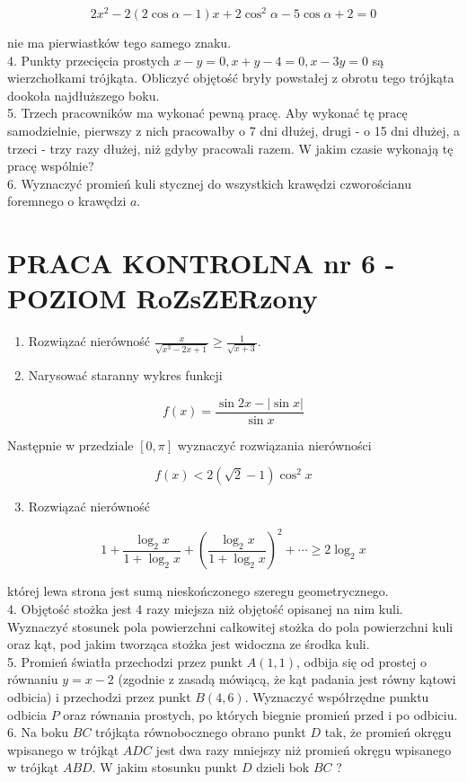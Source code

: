 \documentclass[10pt]{article}
\begin{document}
$$
2 x^{2}-2(2 \cos \alpha-1) x+2 \cos ^{2} \alpha-5 \cos \alpha+2=0
$$

nie ma pierwiastków tego samego znaku.\\
4. Punkty przecięcia prostych $x-y=0, x+y-4=0, x-3 y=0$ są wierzchołkami trójkąta. Obliczyć objętość bryły powstałej z obrotu tego trójkąta dookoła najdłuższego boku.\\
5. Trzech pracowników ma wykonać pewną pracę. Aby wykonać tę pracę samodzielnie, pierwszy z nich pracowałby o 7 dni dłużej, drugi - o 15 dni dłużej, a trzeci - trzy razy dłużej, niż gdyby pracowali razem. W jakim czasie wykonają tę pracę wspólnie?\\
6. Wyznaczyć promień kuli stycznej do wszystkich krawędzi czworościanu foremnego o krawędzi $a$.

\section*{PRACA KONTROLNA nr 6 - POZIOM RoZsZERzony}
\begin{enumerate}
  \item Rozwiązać nierówność $\frac{x}{\sqrt{x^{3}-2 x+1}} \geqslant \frac{1}{\sqrt{x+3}}$.
  \item Narysować staranny wykres funkcji
\end{enumerate}

$$
f(x)=\frac{\sin 2 x-|\sin x|}{\sin x}
$$

Następnie w przedziale $[0, \pi]$ wyznaczyć rozwiązania nierówności

$$
f(x)<2(\sqrt{2}-1) \cos ^{2} x
$$

\begin{enumerate}
  \setcounter{enumi}{2}
  \item Rozwiązać nierówność
\end{enumerate}

$$
1+\frac{\log _{2} x}{1+\log _{2} x}+\left(\frac{\log _{2} x}{1+\log _{2} x}\right)^{2}+\cdots \geqslant 2 \log _{2} x
$$

której lewa strona jest sumą nieskończonego szeregu geometrycznego.\\
4. Objętość stożka jest 4 razy miejsza niż objętość opisanej na nim kuli. Wyznaczyć stosunek pola powierzchni całkowitej stożka do pola powierzchni kuli oraz kąt, pod jakim tworząca stożka jest widoczna ze środka kuli.\\
5. Promień światła przechodzi przez punkt $A(1,1)$, odbija się od prostej o równaniu $y=x-2$ (zgodnie z zasadą mówiącą, że kąt padania jest równy kątowi odbicia) i przechodzi przez punkt $B(4,6)$. Wyznaczyć współrzędne punktu odbicia $P$ oraz równania prostych, po których biegnie promień przed i po odbiciu.\\
6. Na boku $B C$ trójkąta równobocznego obrano punkt $D$ tak, że promień okręgu wpisanego w trójkąt $A D C$ jest dwa razy mniejszy niż promień okręgu wpisanego w trójkąt $A B D$. W jakim stosunku punkt $D$ dzieli bok $B C$ ?
\end{document}

